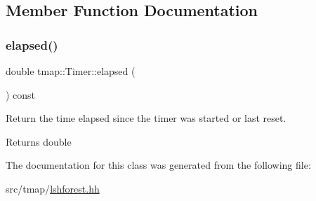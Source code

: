 \subsection{Member Function Documentation}
\mbox{\label{classtmap_1_1Timer_a34a0281aaced5d7768c5bc60ebcd0751}} 
\subsubsection{\texorpdfstring{elapsed()}{elapsed()}}
{\footnotesize\ttfamily double tmap\+::\+Timer\+::elapsed (\begin{DoxyParamCaption}{ }\end{DoxyParamCaption}) const\hspace{0.3cm}{\ttfamily [inline]}}



Return the time elapsed since the timer was started or last reset. 

\begin{DoxyReturn}{Returns}
double 
\end{DoxyReturn}


The documentation for this class was generated from the following file\+:\begin{DoxyCompactItemize}
\item 
src/tmap/\hyperlink{lshforest_8hh}{lshforest.\+hh}\end{DoxyCompactItemize}
